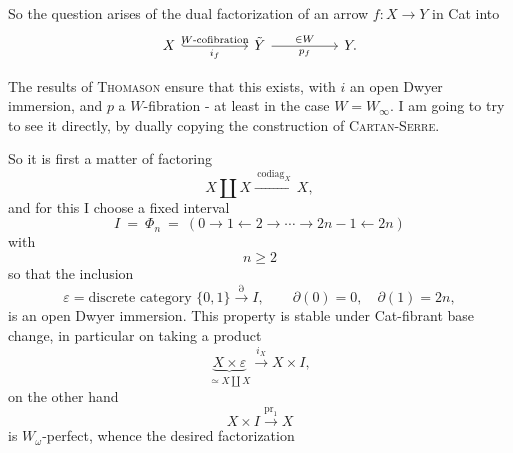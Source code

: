 
So the question arises of the dual factorization of an arrow $f : X \longrightarrow Y$ in Cat into
\[
\begin{tikzcd}[column sep=huge]
X \arrow[r, hook, "W\text{-cofibration}", "i_f"'] & \tilde{Y} \arrow[r, "\in W", "p_f"'] & Y.
\end{tikzcd}
\]

The results of \textsc{Thomason} ensure that this exists, with $i$ an open Dwyer immersion, and $p$ a $W$-fibration - at least in the case $W = W_\infty$. I am going to try to see it directly, by dually copying the construction of \textsc{Cartan-Serre}.

So it is first a matter of factoring
\[
X \amalg X \xrightarrow{\ \mathrm{codiag}_X\ } X,
\]
and for this I choose a fixed interval
\[
I \ = \ \Phi_n \ = \ (0 \longrightarrow 1 \longleftarrow 2 \longrightarrow \cdots \longrightarrow 2n-1 \longleftarrow 2n)
\]
with
\[
n \geq 2
\]
so that the inclusion
\[
\varepsilon = \text{discrete category } \{0,1\} \xrightarrow{\partial} I, \qquad \partial(0) = 0, \quad \partial(1) = 2n,
\]
is an open Dwyer immersion. This property is stable under Cat-fibrant base change, in particular on taking a product
\[
\underbrace{X \times \varepsilon}_{\simeq X \coprod X} \xrightarrow{i_X} X \times I,
\]
\begingroup\renewcommand{\thefootnote}{}\endgroup
{}
on the other hand
\[
X \times I \xrightarrow{\mathrm{pr}_1} X
\]
is $W_\omega$-perfect, whence the desired factorization %
